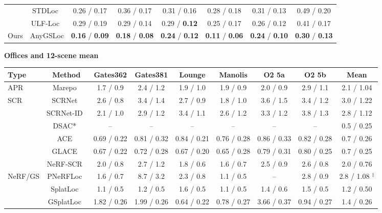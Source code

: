\begin{table}[tp]
\begin{tabular}{lccccccc}
 & STDLoc~\cite{huang2025stdloc} & 0.26 / 0.17 & 0.36 / 0.17 & 0.31 / 0.16 & 0.28 / 0.18 & 0.31 / 0.13 & 0.49 / 0.20 \\
 & ULF-Loc~\cite{gu2026ulfloc} & 0.29 / 0.19 & 0.29 / 0.14 & 0.29 / \textbf{0.12} & 0.25 / 0.17 & 0.26 / 0.12 & 0.41 / 0.17 \\
\midrule
Ours & AnyGSLoc & \textbf{0.16} / \textbf{0.09} & \textbf{0.18} / \textbf{0.08} & \textbf{0.24} / \textbf{0.12} & \textbf{0.11} / \textbf{0.06} & \textbf{0.24} / \textbf{0.10} & \textbf{0.30} / \textbf{0.13} \\
\bottomrule
\end{tabular}
\par\smallskip\textbf{Offices and 12-scene mean}\par\smallskip
\begin{tabular}{lcccccccc}
\toprule
Type & Method & Gates362 & Gates381 & Lounge & Manolis & O2 5a & O2 5b & Mean \\
\midrule
APR & Marepo~\cite{reported260504730v1bibbib24} & 1.7 / 0.9 & 2.4 / 1.2 & 1.9 / 1.0 & 1.9 / 0.9 & 2.0 / 0.9 & 2.9 / 1.1 & 2.1 / 1.04 \\
\midrule
SCR & SCRNet~\cite{reported260504730v1bibbib38} & 2.6 / 0.8 & 3.4 / 1.4 & 2.7 / 0.9 & 1.8 / 1.0 & 3.6 / 1.5 & 3.4 / 1.2 & 3.0 / 1.22 \\
 & SCRNet-ID~\cite{reported260504730v1bibbib62} & 2.1 / 1.0 & 2.9 / 1.2 & 3.4 / 1.1 & 2.6 / 1.2 & 3.3 / 1.2 & 3.8 / 1.3 & 2.8 / 1.12 \\
 & DSAC*~\cite{brachmann2021dsacstar} & -- & -- & -- & -- & -- & -- & 0.5 / 0.25 \\
 & ACE~\cite{brachmann2023ace} & 0.69 / 0.22 & 0.81 / 0.32 & 0.84 / 0.21 & 0.76 / 0.28 & 0.86 / 0.33 & 0.82 / 0.28 & 0.7 / 0.26 \\
 & GLACE~\cite{reported260504730v1bibbib37} & 0.67 / 0.22 & 0.72 / 0.28 & 0.67 / 0.20 & 0.65 / 0.28 & 0.79 / 0.31 & 0.80 / 0.25 & 0.7 / 0.25 \\
 & NeRF-SCR~\cite{reported260504730v1bibbib8} & 2.0 / 0.8 & 2.7 / 1.2 & 1.8 / 0.6 & 1.6 / 0.7 & 2.5 / 0.9 & 2.6 / 0.8 & 2.0 / 0.76 \\
\midrule
NeRF/GS & PNeRFLoc~\cite{reported250319358v1bibbib68} & 1.6 / 0.7 & 8.7 / 3.2 & 2.3 / 0.8 & 1.1 / 0.5 & -- & 2.8 / 0.9 & 2.8 / 1.08 $^\ddagger$ \\
 & SplatLoc~\cite{zhai2025splatloc} & 1.1 / 0.5 & 1.2 / 0.5 & 1.6 / 0.5 & 1.1 / 0.5 & 1.4 / 0.6 & 1.5 / 0.5 & 1.2 / 0.50 \\
 & GSplatLoc~\cite{reported260504730v1bibbib47} & 1.82 / 0.26 & 1.99 / 0.26 & 0.64 / 0.22 & 0.78 / 0.27 & 3.66 / 0.37 & 0.94 / 0.27 & 1.4 / 0.26 \\

\end{tabular}
\end{table}
